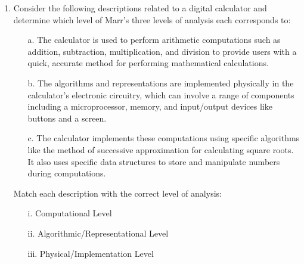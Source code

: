 \documentclass[11pt,letterpaper]{article}
\begin{document}
\begin{enumerate}
    \pagebreak

    \item Consider the following descriptions related to a digital calculator and determine which level of Marr's three levels of analysis each corresponds to:
    \begin{enumerate}
    \item[a.] The calculator is used to perform arithmetic computations such as addition, subtraction, multiplication, and division to provide users with a quick, accurate method for performing mathematical calculations.
    \item[b.] The algorithms and representations are implemented physically in the calculator's electronic circuitry, which can involve a range of components including a microprocessor, memory, and input/output devices like buttons and a screen.
    \item[c.] The calculator implements these computations using specific algorithms like the method of successive approximation for calculating square roots. It also uses specific data structures to store and manipulate numbers during computations.
    \end{enumerate}
    Match each description with the correct level of analysis:
    \begin{enumerate}
    \item[i.] Computational Level
    \item[ii.] Algorithmic/Representational Level
    \item[iii.] Physical/Implementation Level
    \end{enumerate}


    
\end{enumerate}
\end{document}
